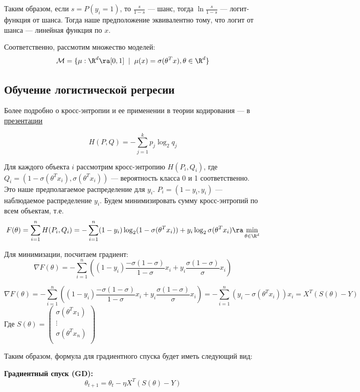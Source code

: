 Таким образом, если \(s = P(y_i = 1)\), то \(\frac{s}{1 - s}\) --- шанс, тогда \(\ln \frac{s}{1 - s}\) --- логит-функция от шанса. Тогда наше предположение эквивалентно тому, что логит от шанса --- линейная функция по \(x\).

Соответственно, рассмотим множество моделей:
\[\mathcal{M} = \{\mu: \R^d \ra [0, 1]\;\;|\;\;\mu(x) = \sigma(\theta^Tx), \theta \in \R^d\}\]

\subsection{Обучение логистической регресии}

Более подробно о кросс-энтропии и ее применении в теории кодирования --- в \href{URL}{презентации}

\begin{definition}
    \[H(P, Q) = -\sum_{j = 1}^k p_j\log_2 q_j\]
\end{definition}

Для каждого объекта \(i\) рассмотрим кросс-энтропию \(H(P_i, Q_i)\), где \(Q_i = (1 - \sigma(\theta^T x_i), \sigma(\theta^T x_i))\) --- вероятность класса 0 и 1 соответственно. Это наше предполагаемое распределение для \(y_i\). \(P_i = (1 - y_i, y_i)\) --- наблюдаемое распределение \(y_i\). Будем минимизировать сумму кросс-энтропий по всем объектам, т.е.
\[F(\theta) = \sum_{i = 1}^n H(P_i, Q_i) = -\sum_{i = 1}^n (1 - y_i)\log_2(1 - \sigma(\theta^Tx_i)) + y_i\log_2\sigma(\theta^Tx_i) \ra \min_{\theta \in \R^d}\]

Для минимизации, посчитаем градиент:
\[\nabla F(\theta) = -\sum_{i = 1}^n \left((1 - y_i)\frac{-\sigma(1 - \sigma)}{1 - \sigma}x_i + y_i\frac{\sigma(1 - \sigma)}{\sigma}x_i\right)\]

\[\nabla F(\theta) = -\sum_{i = 1}^n \left((1 - y_i)\frac{-\sigma(1 - \sigma)}{1 - \sigma}x_i + y_i\frac{\sigma(1 - \sigma)}{\sigma}x_i\right) = -\sum_{i = 1}^n (y_i - \sigma(\theta^T x_i))x_i = X^T(S(\theta) - Y)\]
Где \(S(\theta) = \left(\begin{array}{c}
    \sigma(\theta^T x_1) \\
    \vdots \\
    \sigma(\theta^T x_n) \\
\end{array}\right)\)

Таким образом, формула для градиентного спуска будет иметь следующий вид:

\noindent\textbf{Градиентный спуск (GD):}
\[\theta_{t + 1} = \theta_t - \eta X^T(S(\theta) - Y)\]

